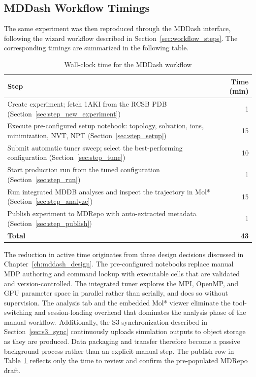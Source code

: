 \documentclass[
  digital,     %
  color,       %
  oneside,     %
  nosansbold,  %
  nocolorbold, %
  lof,         %
  lot,         %
]{fithesis4}
\begin{document}
\subsection{MDDash Workflow Timings}

The same experiment was then reproduced through the MDDash interface, following the wizard workflow described in Section~\ref{sec:workflow_steps}. The corresponding timings are summarized in the following table.

\begin{table}[H]
\caption{Wall-clock time for the MDDash workflow}
\label{tab:mddash-timings}
\begin{tabularx}{\linewidth}{Xr}
\hline
\textbf{Step} & \textbf{Time (min)} \\
\hline
Create experiment; fetch 1AKI from the RCSB PDB (Section~\ref{sec:step_new_experiment}) & 1 \\
Execute pre-configured setup notebook: topology, solvation, ions, minimization, NVT, NPT (Section~\ref{sec:step_setup}) & 15 \\
Submit automatic tuner sweep; select the best-performing configuration (Section~\ref{sec:step_tune}) & 10 \\
Start production run from the tuned configuration (Section~\ref{sec:step_run}) & 1 \\
Run integrated MDDB analyses and inspect the trajectory in Mol* (Section~\ref{sec:step_analyze}) & 15 \\
Publish experiment to MDRepo with auto-extracted metadata (Section~\ref{sec:step_publish}) & 1 \\
\hline
\textbf{Total} & \textbf{43} \\
\hline
\end{tabularx}
\end{table}

The reduction in active time originates from three design decisions discussed in Chapter~\ref{ch:mddash_design}. The pre-configured notebooks replace manual MDP authoring and command lookup with executable cells that are validated and version-controlled. The integrated tuner explores the MPI, OpenMP, and GPU parameter space in parallel rather than serially, and does so without supervision. The analysis tab and the embedded Mol* viewer eliminate the tool-switching and session-loading overhead that dominates the analysis phase of the manual workflow. Additionally, the S3 synchronization described in Section~\ref{sec:s3_sync} continuously uploads simulation outputs to object storage as they are produced. Data packaging and transfer therefore become a passive background process rather than an explicit manual step. The publish row in Table~\ref{tab:mddash-timings} reflects only the time to review and confirm the pre-populated MDRepo draft.
\end{document}
